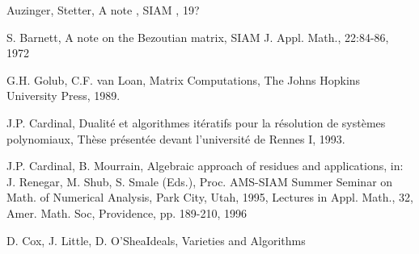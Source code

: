 \documentclass{standalone}
\begin{document}
  \begin{thebibliography}{00}

  {Auzinger, Stetter}, {A note }, {SIAM }, {19?}

  {S. Barnett}, {A note on the Bezoutian matrix}, {SIAM J. Appl. Math., 22:84-86}, {1972}

  {G.H. Golub, C.F. van Loan}, {Matrix Computations}, {The Johns Hopkins University Press}, {1989}.

  {J.P. Cardinal}, {Dualité et algorithmes itératifs pour la résolution de systèmes polynomiaux}, {Thèse présentée devant l'université de Rennes I}, {1993}.

  {J.P. Cardinal, B. Mourrain}, {Algebraic approach of residues and applications}, {in: J. Renegar, M. Shub, S. Smale (Eds.), Proc. AMS-SIAM Summer Seminar on Math. of Numerical Analysis, Park City, Utah, 1995, Lectures in Appl. Math., 32, Amer. Math. Soc, Providence, pp. 189-210}, {1996}

  {D. Cox, J. Little, D. O'Shea}{Ideals, Varieties and Algorithms}
  \end{thebibliography}
\end{document}
